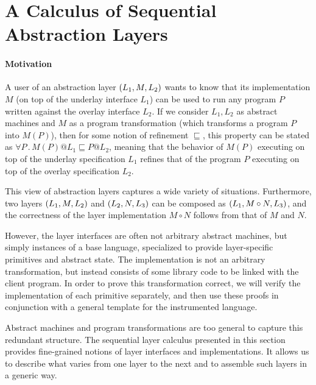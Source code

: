 \section{A Calculus of Sequential Abstraction Layers}
\label{sec:seq:layer}

\paragraph{Motivation}

A user of an abstraction layer $(L_1,M,L_2)$ wants to know
that its implementation $M$ (on top of the underlay interface $L_1$)
can be used to run any program $P$ written against the overlay
interface $L_2$.
If we consider $L_1, L_2$ as abstract machines
and $M$ as a program transformation (which transforms
a program $P$ into $M(P)$), 
then for some notion of refinement $\sqsubseteq$,
this property can be stated as
$\forall P \,.\, M(P) @ L_1 \sqsubseteq P @ L_2$,
meaning that the behavior of $M(P)$ executing
on top of the underlay specification $L_1$
refines that of the program $P$
executing on top of the overlay specification $L_2$.

This view of abstraction layers captures a wide variety of situations.
Furthermore, two layers $(L_1,M,L_2)$ and
$(L_2,N,L_3)$ can be composed as $(L_1,M \circ
  N,L_3)$, and the correctness of the layer implementation $M \circ
N$ follows from that of $M$ and $N$.  

However, 
the layer interfaces
are often not arbitrary abstract machines, but simply instances of a base
language, specialized to provide layer-specific primitives and
abstract state.  The implementation is not an arbitrary
transformation, but instead consists of some library code to be linked
with the client program.  In order to prove this transformation correct,
we will verify the implementation of each primitive
separately, and then use these proofs in conjunction with a
general template for the instrumented language.

Abstract machines and program transformations are too general to
capture this redundant structure.  The sequential layer calculus
presented in this section provides fine-grained notions of layer
interfaces and implementations.  It allows us to describe what varies
from one layer to the next and to assemble such layers 
in a generic way.

